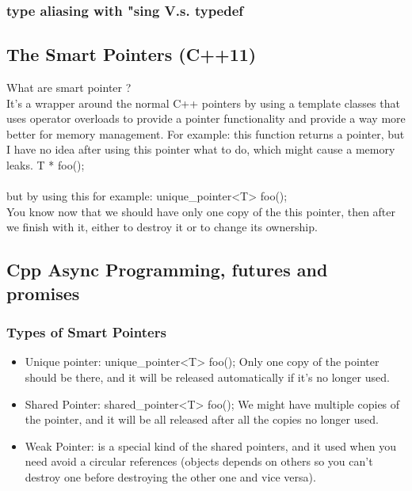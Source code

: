 \documentclass{article}
\begin{document}
\subsubsection{type aliasing with "sing V.s. typedef}

\subsection{The Smart Pointers (C++11)}
What are smart pointer ?\\
It's a wrapper around the normal C++ pointers by using a template classes that uses operator overloads to provide a pointer functionality and provide a way more better for memory management. 
For example:
this function returns a pointer, but I have no idea after using this pointer what to do, which might cause a memory leaks.
T * foo();\\\\

but by using this for example: unique\_pointer<T> foo();\\
You know now that we should have only one copy of the this pointer, then after we finish with it, either to destroy it or to change its ownership.

\subsection{Cpp Async Programming, futures and promises}

\subsubsection{Types of Smart Pointers}
\begin{itemize} 
  \item Unique pointer: unique\_pointer<T> foo();
    Only one copy of the pointer should be there, and it will be released automatically if it's no longer used.

  \item Shared Pointer: shared\_pointer<T> foo();
    We might have multiple copies of the pointer, and it will be all released after all the copies no longer used.
  
  \item Weak Pointer: is a special kind of the shared pointers, and it used when you need avoid a circular references (objects depends on others so you can't destroy one before destroying the other one and vice versa).
\end{itemize}
\end{document}
